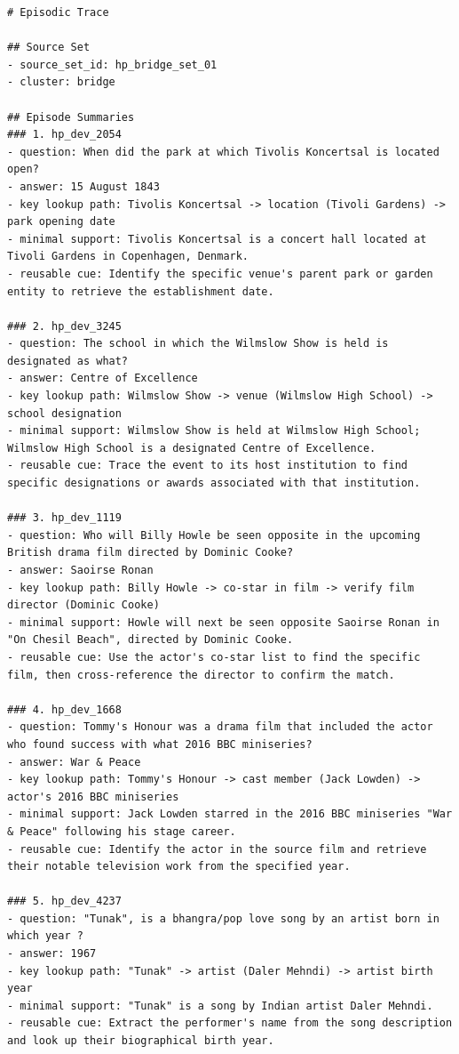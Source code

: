 \begin{lstlisting}
# Episodic Trace

## Source Set
- source_set_id: hp_bridge_set_01
- cluster: bridge

## Episode Summaries
### 1. hp_dev_2054
- question: When did the park at which Tivolis Koncertsal is located open?
- answer: 15 August 1843
- key lookup path: Tivolis Koncertsal -> location (Tivoli Gardens) -> park opening date
- minimal support: Tivolis Koncertsal is a concert hall located at Tivoli Gardens in Copenhagen, Denmark.
- reusable cue: Identify the specific venue's parent park or garden entity to retrieve the establishment date.

### 2. hp_dev_3245
- question: The school in which the Wilmslow Show is held is designated as what?
- answer: Centre of Excellence
- key lookup path: Wilmslow Show -> venue (Wilmslow High School) -> school designation
- minimal support: Wilmslow Show is held at Wilmslow High School; Wilmslow High School is a designated Centre of Excellence.
- reusable cue: Trace the event to its host institution to find specific designations or awards associated with that institution.

### 3. hp_dev_1119
- question: Who will Billy Howle be seen opposite in the upcoming British drama film directed by Dominic Cooke?
- answer: Saoirse Ronan
- key lookup path: Billy Howle -> co-star in film -> verify film director (Dominic Cooke)
- minimal support: Howle will next be seen opposite Saoirse Ronan in "On Chesil Beach", directed by Dominic Cooke.
- reusable cue: Use the actor's co-star list to find the specific film, then cross-reference the director to confirm the match.

### 4. hp_dev_1668
- question: Tommy's Honour was a drama film that included the actor who found success with what 2016 BBC miniseries?
- answer: War & Peace
- key lookup path: Tommy's Honour -> cast member (Jack Lowden) -> actor's 2016 BBC miniseries
- minimal support: Jack Lowden starred in the 2016 BBC miniseries "War & Peace" following his stage career.
- reusable cue: Identify the actor in the source film and retrieve their notable television work from the specified year.

### 5. hp_dev_4237
- question: "Tunak", is a bhangra/pop love song by an artist born in which year ?
- answer: 1967
- key lookup path: "Tunak" -> artist (Daler Mehndi) -> artist birth year
- minimal support: "Tunak" is a song by Indian artist Daler Mehndi.
- reusable cue: Extract the performer's name from the song description and look up their biographical birth year.


\end{lstlisting}
